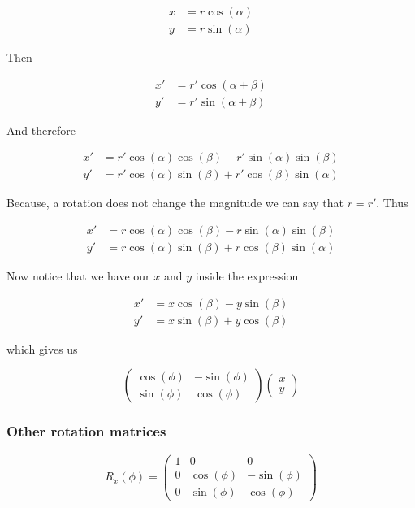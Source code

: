 \begin{align*}
    x &= r \cos(\alpha)\\
    y &= r \sin(\alpha)
\end{align*}

Then 

\begin{align*}
    x' &= r' \cos(\alpha + \beta)\\
    y' &= r' \sin(\alpha + \beta)
\end{align*}

And therefore

\begin{align*}
    x' &= r' \cos(\alpha)\cos(\beta) - r'\sin(\alpha)\sin(\beta)\\
    y' &= r' \cos(\alpha)\sin(\beta) + r'\cos(\beta)\sin(\alpha)
\end{align*}

Because, a rotation does not change the magnitude we can say that \(r = r'\). Thus 

\begin{align*}
    x' &= r \cos(\alpha)\cos(\beta) - r\sin(\alpha)\sin(\beta)\\
    y' &= r \cos(\alpha)\sin(\beta) + r\cos(\beta)\sin(\alpha)
\end{align*}

Now notice that we have our \(x\) and \(y\) inside the expression

\begin{align*}
    x' &= x\cos(\beta) - y\sin(\beta)\\
    y' &= x\sin(\beta) + y\cos(\beta)
\end{align*}

which gives us 

\[
    \begin{pmatrix}
        \cos(\phi) & -\sin(\phi)\\
        \sin(\phi) & \cos(\phi)
    \end{pmatrix}
    \begin{pmatrix}
        x\\
        y
    \end{pmatrix}
\]

\QED

\subsubsection{Other rotation matrices}

\[
    R_x (\phi) =
    \begin{pmatrix}
        1 & 0 & 0 \\
        0 & \cos(\phi) & -\sin(\phi) \\
        0 & \sin(\phi) & \cos(\phi)
    \end{pmatrix}
\]

